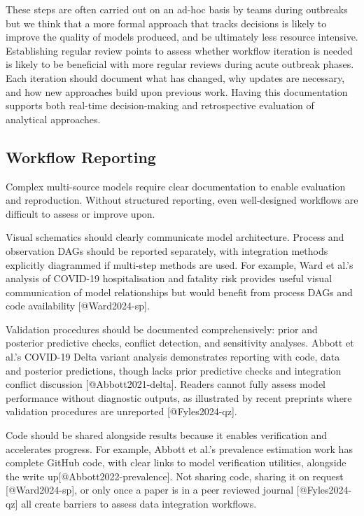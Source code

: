 \documentclass{article}
\begin{document}
These steps are often carried out on an ad-hoc basis by teams during outbreaks but we think that a more formal approach that tracks decisions is likely to improve the quality of models produced, and be ultimately less resource intensive.
Establishing regular review points to assess whether workflow iteration is needed is likely to be beneficial with more regular reviews during acute outbreak phases.
Each iteration should document what has changed, why updates are necessary, and how new approaches build upon previous work.
Having this documentation supports both real-time decision-making and retrospective evaluation of analytical approaches.

\subsection{Workflow Reporting}

Complex multi-source models require clear documentation to enable evaluation and reproduction.
Without structured reporting, even well-designed workflows are difficult to assess or improve upon.

Visual schematics should clearly communicate model architecture.
Process and observation DAGs should be reported separately, with integration methods explicitly diagrammed if multi-step methods are used.
For example, Ward et al.'s analysis of COVID-19 hospitalisation and fatality risk provides useful visual communication of model relationships but would benefit from process DAGs and code availability [@Ward2024-sp].

Validation procedures should be documented comprehensively: prior and posterior predictive checks, conflict detection, and sensitivity analyses.
Abbott et al.'s COVID-19 Delta variant analysis demonstrates reporting with code, data and posterior predictions, though lacks prior predictive checks and integration conflict discussion [@Abbott2021-delta].
Readers cannot fully assess model performance without diagnostic outputs, as illustrated by recent preprints where validation procedures are unreported [@Fyles2024-qz].

Code should be shared alongside results because it enables verification and accelerates progress.
For example, Abbott et al.'s prevalence estimation work has complete GitHub code, with clear links to model verification utilities, alongside the write up[@Abbott2022-prevalence].
Not sharing code, sharing it on request [@Ward2024-sp], or only once a paper is in a peer reviewed journal [@Fyles2024-qz] all create barriers to assess data integration workflows.
\end{document}
